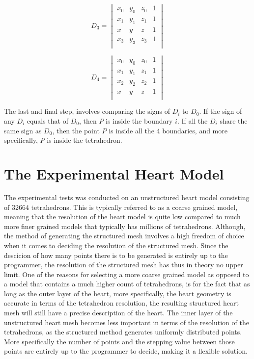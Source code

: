 \[
D_{3} =
\begin{vmatrix}
x_{0} & y_{0} & z_{0} & 1 \\ 
x_{1} & y_{1} & z_{1} & 1 \\ 
x & y & z & 1 \\ 
x_{3} & y_{3} & z_{3} & 1 \\ 
\end{vmatrix}
\]

\[
D_{4} =
\begin{vmatrix}
x_{0} & y_{0} & z_{0} & 1 \\ 
x_{1} & y_{1} & z_{1} & 1 \\ 
x_{2} & y_{2} & z_{2} & 1 \\ 
x & y & z & 1 \\ 
\end{vmatrix}
\]

The last and final step, involves comparing the signs of \(D_{i}\) to \(D_{0}\). If the sign of any \(D_{i}\) equals that of \(D_{0}\), then \(P\) is inside the boundary \(i\). If all the \(D_{i}\) share the same sign as \(D_{0}\), then the point \(P\) is inside all the 4 boundaries, and more specifically, \(P\) is inside the tetrahedron.

\section{The Experimental Heart Model}
The experimental tests was conducted on an unstructured heart model consisting of 32664 tetrahedrons. This is typically referred to as a coarse grained model, meaning that the resolution of the heart model is quite low compared to much more finer grained models that typically has millions of tetrahedrons. Although, the method of generating the structured mesh involves a high freedom of choice when it comes to deciding the resolution of the structured mesh. Since the descicion of how many points there is to be generated is entirely up to the programmer, the resolution of the structured mesh has thus in theory no upper limit. One of the reasons for selecting a more coarse grained model as opposed to a model that contains a much higher count of tetrahedrons, is for the fact that as long as the outer layer of the heart, more specifically, the heart geometry is accurate in terms of the tetrahedron resolution, the resulting structured heart mesh will still have a precise description of the heart. The inner layer of the unstructured heart mesh becomes less important in terms of the resolution of the tetrahedrons, as the structured method generates uniformly distributed points. More specifically the number of points and the stepping value between those points are entirely up to the programmer to decide, making it a flexible solution.

